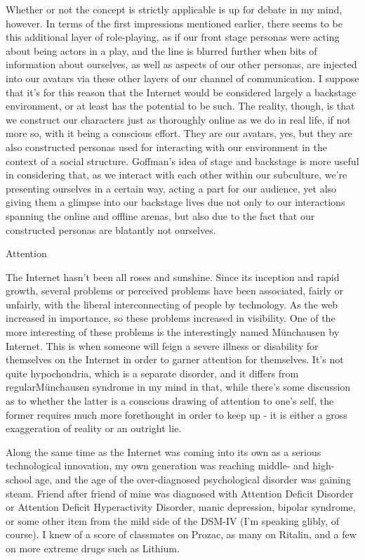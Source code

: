 Whether or not the concept is strictly applicable is up for debate in my mind, however. In terms of the first impressions mentioned earlier, there seems to be this additional layer of role-playing, as if our front stage personas were acting about being actors in a play, and the line is blurred further when bits of information about ourselves, as well as aspects of our other personas, are injected into our avatars via these other layers of our channel of communication. I suppose that it's for this reason that the Internet would be considered largely a backstage environment, or at least has the potential to be such. The reality, though, is that we construct our characters just as thoroughly online as we do in real life, if not more so, with it being a conscious effort. They are our avatars, yes, but they are also constructed personas used for interacting with our environment in the context of a social structure. Goffman's idea of stage and backstage is more useful in considering that, as we interact with each other within our subculture, we're presenting ourselves in a certain way, acting a part for our audience, yet also giving them a glimpse into our backstage lives due not only to our interactions spanning the online and offline arenas, but also due to the fact that our constructed personas are blatantly not ourselves.

Attention

The Internet hasn't been all roses and sunshine. Since its inception and rapid growth, several problems or perceived problems have been associated, fairly or unfairly, with the liberal interconnecting of people by technology. As the web increased in importance, so these problems increased in visibility. One of the more interesting of these problems is the interestingly named Münchausen by Internet. This is when someone will feign a severe illness or disability for themselves on the Internet in order to garner attention for themselves. It's not quite hypochondria, which is a separate disorder, and it differs from regularMünchausen syndrome in my mind in that, while there's some discussion as to whether the latter is a conscious drawing of attention to one's self, the former requires much more forethought in order to keep up - it is either a gross exaggeration of reality or an outright lie.

Along the same time as the Internet was coming into its own as a serious technological innovation, my own generation was reaching middle- and high-school age, and the age of the over-diagnosed psychological disorder was gaining steam. Friend after friend of mine was diagnosed with Attention Deficit Disorder or Attention Deficit Hyperactivity Disorder, manic depression, bipolar syndrome, or some other item from the mild side of the DSM-IV (I'm speaking glibly, of course). I knew of a score of classmates on Prozac, as many on Ritalin, and a few on more extreme drugs such as Lithium.

